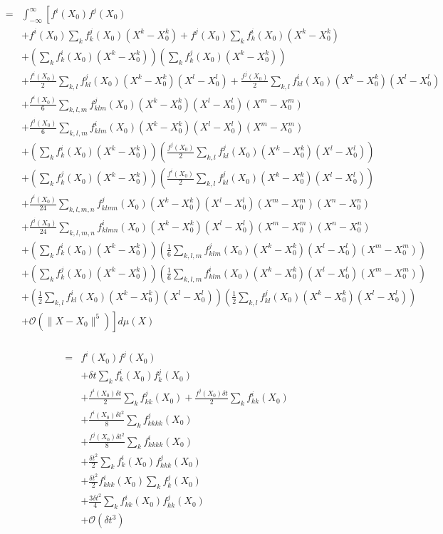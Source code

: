 \documentclass[12pt]{article}
\begin{document}
\begin{eqnarray}
&=& \int_{-\infty}^{\infty} \left[ 
f^i(X_0) f^j(X_0) \right. \\
&&+ f^i(X_0) \sum_k f^j_k(X_0) (X^k-X_0^k) 
+ f^j(X_0) \sum_k f^i_k(X_0) (X^k-X_0^k) \\
&& + \left(  \sum_k f^i_k(X_0) (X^k-X_0^k)  \right) \left(  \sum_k f^j_k(X_0) (X^k-X_0^k)  \right) \\
&& \left. + \frac{f^i(X_0)}{2} \sum_{k,l} f^j_{kl}(X_0) (X^k-X_0^k) (X^l-X_0^l) 
+ \frac{f^j(X_0)}{2} \sum_{k,l} f^i_{kl}(X_0) (X^k-X_0^k) (X^l-X_0^l)  \right. \\
&& + \frac{f^i(X_0)}{6} \sum_{k,l,m} f^j_{klm} (X_0) (X^k-X_0^k) (X^l-X_0^l) (X^m-X_0^m) \\
&& + \frac{f^j(X_0)}{6} \sum_{k,l,m} f^i_{klm} (X_0) (X^k-X_0^k) (X^l-X_0^l) (X^m-X_0^m) \\
&& + \left(\sum_k f^i_k(X_0) (X^k-X_0^k) \right) \left( \frac{f^j(X_0)}{2} \sum_{k,l} f^j_{kl}(X_0) (X^k-X_0^k) (X^l-X_0^l)  \right) \\
&& + \left(\sum_k f^j_k(X_0) (X^k-X_0^k) \right) \left( \frac{f^i(X_0)}{2} \sum_{k,l} f^j_{kl}(X_0) (X^k-X_0^k) (X^l-X_0^l)  \right)\\
&&+ \frac{f^i(X_0) }{24} \sum_{k,l,m,n} f^j_{klmn} (X_0) (X^k-X_0^k) (X^l-X_0^l) (X^m-X_0^m) (X^n-X_0^n) \\
&& + \frac{f^j(X_0) }{24} \sum_{k,l,m,n} f^i_{klmn} (X_0) (X^k-X_0^k) (X^l-X_0^l) (X^m-X_0^m) (X^n-X_0^n) \\
&& + \left( \sum_k f^i_k(X_0) (X^k-X_0^k) \right) \left( \frac{1}{6} \sum_{k,l,m} f^j_{klm} (X_0) (X^k-X_0^k) (X^l-X_0^l) (X^m-X_0^m)  \right) \\
&& + \left( \sum_k f^j_k(X_0) (X^k-X_0^k) \right) \left( \frac{1}{6} \sum_{k,l,m} f^i_{klm} (X_0) (X^k-X_0^k) (X^l-X_0^l) (X^m-X_0^m)  \right) \\
&&+ \left( \frac{1}{2} \sum_{k,l} f^i_{kl}(X_0) (X^k-X_0^k) (X^l-X_0^l)  \right) \left( \frac{1}{2} \sum_{k,l} f^j_{kl}(X_0) (X^k-X_0^k) (X^l-X_0^l)  \right) \\
&&\left. + \mathcal{O}\left( \| X- X_0 \|^5 \right) \right] d\mu(X) \\
 \end{eqnarray}
 
 \begin{eqnarray}
 &=& 
f^i(X_0) f^j(X_0) \\
&& + \delta t \sum_k f^i_k(X_0)  f^j_k(X_0) \\
&&  + \frac{f^i(X_0) \delta t}{2} \sum_{k} f^j_{kk}(X_0)
+ \frac{f^j(X_0) \delta t}{2} \sum_{k} f^i_{kk}(X_0)  \\
&&+ \frac{f^i(X_0) \delta t^2}{8} \sum_{k} f^j_{kkkk} (X_0) \\
&& + \frac{f^j(X_0) \delta t^2}{8} \sum_{k} f^i_{kkkk} (X_0)\\
&& + \frac{\delta t^2}{2} \sum_k f^i_k(X_0) f^j_{kkk} (X_0)  \\
&& + \frac{\delta t^2}{2}  f^i_{kkk} (X_0) \sum_k f^j_k(X_0) \\
&&+  \frac{3  \delta t^2}{4} \sum_{k} f^i_{kk}(X_0) f^j_{kk}(X_0) \\
&& + \mathcal{O}\left( \delta t^3 \right) 
\end{eqnarray}
\end{document}
